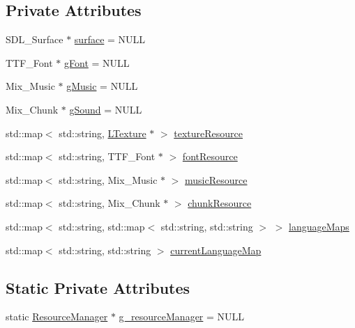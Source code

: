 \subsection*{Private Attributes}
\begin{DoxyCompactItemize}
\item 
S\+D\+L\+\_\+\+Surface $\ast$ \mbox{\hyperlink{class_resource_manager_a9c8ceb6493f5aeb3b32deca6bd302286}{surface}} = N\+U\+LL
\item 
T\+T\+F\+\_\+\+Font $\ast$ \mbox{\hyperlink{class_resource_manager_a8460e56a6e4e273f1174c876b92ddd51}{g\+Font}} = N\+U\+LL
\item 
Mix\+\_\+\+Music $\ast$ \mbox{\hyperlink{class_resource_manager_a2c2937d898100b3ebdb4ee83d9b8068a}{g\+Music}} = N\+U\+LL
\item 
Mix\+\_\+\+Chunk $\ast$ \mbox{\hyperlink{class_resource_manager_a81606e68b21fbed78d70aedf21661552}{g\+Sound}} = N\+U\+LL
\item 
std\+::map$<$ std\+::string, \mbox{\hyperlink{class_l_texture}{L\+Texture}} $\ast$ $>$ \mbox{\hyperlink{class_resource_manager_a110ad3ce3aae0e775037628a2e57fd65}{texture\+Resource}}
\item 
std\+::map$<$ std\+::string, T\+T\+F\+\_\+\+Font $\ast$ $>$ \mbox{\hyperlink{class_resource_manager_a63134aee6e58b1e7aa4e602a7ca53e44}{font\+Resource}}
\item 
std\+::map$<$ std\+::string, Mix\+\_\+\+Music $\ast$ $>$ \mbox{\hyperlink{class_resource_manager_a927cffffb3a9199ad533328c5d464b56}{music\+Resource}}
\item 
std\+::map$<$ std\+::string, Mix\+\_\+\+Chunk $\ast$ $>$ \mbox{\hyperlink{class_resource_manager_a9424aa5a090581d34baacd8c1028fe18}{chunk\+Resource}}
\item 
std\+::map$<$ std\+::string, std\+::map$<$ std\+::string, std\+::string $>$ $>$ \mbox{\hyperlink{class_resource_manager_a5c55ddf3598df4e86e4b8c76c6a78907}{language\+Maps}}
\item 
std\+::map$<$ std\+::string, std\+::string $>$ \mbox{\hyperlink{class_resource_manager_a58ba6ab4799fe3d44082fc91960ed3c4}{current\+Language\+Map}}
\end{DoxyCompactItemize}
\subsection*{Static Private Attributes}
\begin{DoxyCompactItemize}
\item 
static \mbox{\hyperlink{class_resource_manager}{Resource\+Manager}} $\ast$ \mbox{\hyperlink{class_resource_manager_a0793631b5cdb7b23245a70227a33acbd}{g\+\_\+resource\+Manager}} = N\+U\+LL
\end{DoxyCompactItemize}


